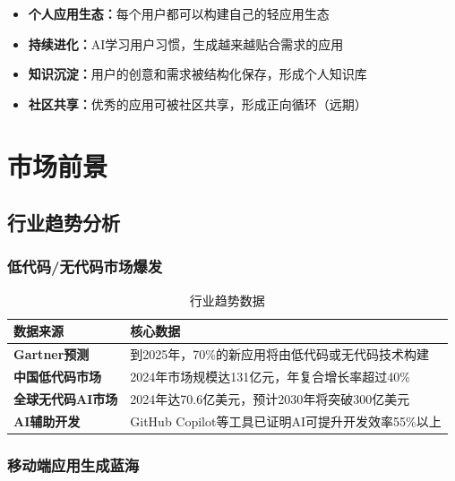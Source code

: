 \documentclass[a4paper,12pt]{ctexart}
\newcommand{\highlight}[1]{\textcolor{vivoblue}{\textbf{#1}}}
\begin{document}
\begin{itemize}[leftmargin=2em]
    \item \highlight{个人应用生态：}每个用户都可以构建自己的轻应用生态
    \item \highlight{持续进化：}AI学习用户习惯，生成越来越贴合需求的应用
    \item \highlight{知识沉淀：}用户的创意和需求被结构化保存，形成个人知识库
    \item \highlight{社区共享：}优秀的应用可被社区共享，形成正向循环（远期）
\end{itemize}

\section{市场前景}

\subsection{行业趋势分析}

\subsubsection{低代码/无代码市场爆发}

\begin{table}[H]
    \centering
    \caption{行业趋势数据}
    \begin{tabularx}{\textwidth}{|l|X|}
        \hline
        \textbf{数据来源} & \textbf{核心数据} \\
        \hline
        \highlight{Gartner预测} & 到2025年，70\%的新应用将由低代码或无代码技术构建 \\
        \hline
        \highlight{中国低代码市场} & 2024年市场规模达131亿元，年复合增长率超过40\% \\
        \hline
        \highlight{全球无代码AI市场} & 2024年达70.6亿美元，预计2030年将突破300亿美元 \\
        \hline
        \highlight{AI辅助开发} & GitHub Copilot等工具已证明AI可提升开发效率55\%以上 \\
        \hline
    \end{tabularx}
\end{table}

\subsubsection{移动端应用生成蓝海}
\end{document}
